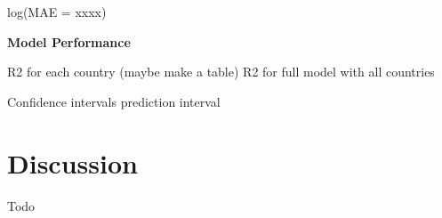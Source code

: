 \documentclass[11pt,oneside,letterpaper]{article}
\begin{document}
log(MAE = xxxx)


\textbf{Model Performance}

R2 for each country (maybe make a table)
R2 for full model with all countries

Confidence intervals
prediction interval


% 




%




















\section*{Discussion}

Todo
















\end{document}
